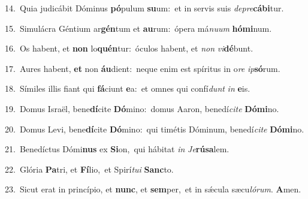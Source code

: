 {\numbfont\textcolor{\numbcolor}{14.}}~Quia judicábit Dóminus \textbf{pó}\-pulum \textbf{su}\-um:~\star et in servis suis \textit{de}\-\textit{pre}\textbf{cá}\textbf{bi}tur.\par
{\numbfont\textcolor{\numbcolor}{15.}}~Simulácra Géntium ar\-\textbf{gén}\-tum et \textbf{au}\-rum:~\star ópera má\-\textit{nu}\-\textit{um} \textbf{hó}\-\textbf{mi}num.\par
{\numbfont\textcolor{\numbcolor}{16.}}~Os habent, et \textbf{non} lo\-\textbf{quén}\-tur:~\star óculos habent, et \textit{non} \textit{vi}\-\textbf{dé}bunt.\par
{\numbfont\textcolor{\numbcolor}{17.}}~Aures habent, \textbf{et} non \textbf{áu}\-dient:~\star neque enim est spíritus in o\textit{re} \textit{ip}\-\textbf{só}rum.\par
{\numbfont\textcolor{\numbcolor}{18.}}~Símiles illis fiant qui \textbf{fá}\-ciunt \textbf{e}\-a:~\star et omnes qui confí\textit{dunt} \textit{in} \textbf{e}\-is.\par
{\numbfont\textcolor{\numbcolor}{19.}}~Domus Israël, bene\-\textbf{dí}\-cite \textbf{Dó}\-mino:~\star domus Aaron, benedí\-\textit{ci}\-\textit{te} \textbf{Dó}\-\textbf{mi}no.\par
{\numbfont\textcolor{\numbcolor}{20.}}~Domus Levi, bene\-\textbf{dí}\-cite \textbf{Dó}\-mino:~\star qui timétis Dóminum, benedí\-\textit{ci}\-\textit{te} \textbf{Dó}\-\textbf{mi}no.\par
{\numbfont\textcolor{\numbcolor}{21.}}~Benedíctus Dómi\textbf{nus} ex \textbf{Si}\-on,~\star qui hábitat \textit{in} \textit{Je}\-\textbf{rú}\textbf{sa}lem.\par
{\numbfont\textcolor{\numbcolor}{22.}}~Glória \textbf{Pa}\-tri, et \textbf{Fí}\-lio,~\star et Spirí\-\textit{tu}\-\textit{i} \textbf{Sanc}\-to.\par
{\numbfont\textcolor{\numbcolor}{23.}}~Sicut erat in princípio, et \textbf{nunc}\-, et \textbf{sem}\-per,~\star et in sǽcula sæcu\-\textit{ló}\-\textit{rum}. \textbf{A}\-men.\par
